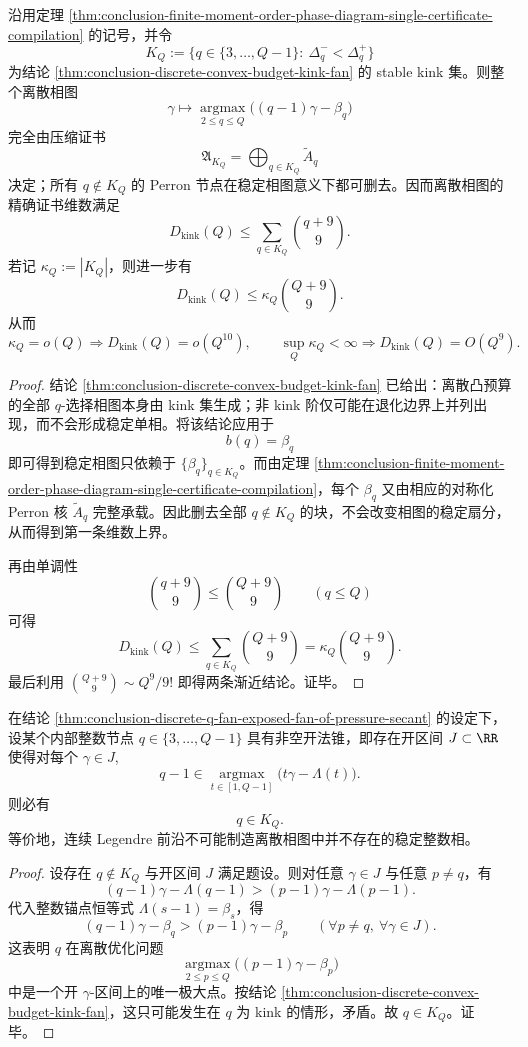 \begin{corollary}\label{cor:conclusion-kink-sparse-phase-diagram-exact-compression}
沿用定理 \ref{thm:conclusion-finite-moment-order-phase-diagram-single-certificate-compilation} 的记号，并令
\[
K_Q:=\{q\in\{3,\dots,Q-1\}:\ \Delta_q^-<\Delta_q^+\}
\]
为结论 \ref{thm:conclusion-discrete-convex-budget-kink-fan} 的 stable kink 集。则整个离散相图
\[
\gamma\longmapsto \operatorname*{argmax}_{2\le q\le Q}\bigl((q-1)\gamma-\beta_q\bigr)
\]
完全由压缩证书
\[
\mathfrak A_{K_Q}=\bigoplus_{q\in K_Q}\widetilde A_q
\]
决定；所有 \(q\notin K_Q\) 的 Perron 节点在稳定相图意义下都可删去。因而离散相图的精确证书维数满足
\[
D_{\mathrm{kink}}(Q)
\le
\sum_{q\in K_Q}\binom{q+9}{9}.
\]
若记 \(\kappa_Q:=|K_Q|\)，则进一步有
\[
D_{\mathrm{kink}}(Q)\le \kappa_Q\binom{Q+9}{9}.
\]
从而
\[
\kappa_Q=o(Q)\Longrightarrow D_{\mathrm{kink}}(Q)=o(Q^{10}),
\qquad
\sup_Q\kappa_Q<\infty \Longrightarrow D_{\mathrm{kink}}(Q)=O(Q^9).
\]
\end{corollary}
\begin{proof}
结论 \ref{thm:conclusion-discrete-convex-budget-kink-fan} 已给出：离散凸预算的全部 \(q\)-选择相图本身由 kink 集生成；非 kink 阶仅可能在退化边界上并列出现，而不会形成稳定单相。将该结论应用于
\[
b(q)=\beta_q
\]
即可得到稳定相图只依赖于 \(\{\beta_q\}_{q\in K_Q}\)。而由定理 \ref{thm:conclusion-finite-moment-order-phase-diagram-single-certificate-compilation}，每个 \(\beta_q\) 又由相应的对称化 Perron 核 \(\widetilde A_q\) 完整承载。因此删去全部 \(q\notin K_Q\) 的块，不会改变相图的稳定扇分，从而得到第一条维数上界。

再由单调性
\[
\binom{q+9}{9}\le \binom{Q+9}{9}
\qquad (q\le Q)
\]
可得
\[
D_{\mathrm{kink}}(Q)\le \sum_{q\in K_Q}\binom{Q+9}{9}
=
\kappa_Q\binom{Q+9}{9}.
\]
最后利用 \(\binom{Q+9}{9}\sim Q^9/9!\) 即得两条渐近结论。证毕。
\end{proof}

\begin{theorem}[连续压力前沿的无伪整数相]\label{thm:conclusion-continuous-pressure-front-has-no-fake-integer-phases}
在结论 \ref{thm:conclusion-discrete-q-fan-exposed-fan-of-pressure-secant} 的设定下，设某个内部整数节点 \(q\in\{3,\dots,Q-1\}\) 具有非空开法锥，即存在开区间 \(J\subset\RR\) 使得对每个 \(\gamma\in J\),
\[
q-1\in\operatorname*{argmax}_{t\in[1,Q-1]}\bigl(t\gamma-\Lambda(t)\bigr).
\]
则必有
\[
q\in K_Q.
\]
等价地，连续 Legendre 前沿不可能制造离散相图中并不存在的稳定整数相。
\end{theorem}
\begin{proof}
设存在 \(q\notin K_Q\) 与开区间 \(J\) 满足题设。则对任意 \(\gamma\in J\) 与任意 \(p\neq q\)，有
\[
(q-1)\gamma-\Lambda(q-1)>(p-1)\gamma-\Lambda(p-1).
\]
代入整数锚点恒等式 \(\Lambda(s-1)=\beta_s\)，得
\[
(q-1)\gamma-\beta_q>(p-1)\gamma-\beta_p
\qquad (\forall p\neq q,\ \forall \gamma\in J).
\]
这表明 \(q\) 在离散优化问题
\[
\operatorname*{argmax}_{2\le p\le Q}\bigl((p-1)\gamma-\beta_p\bigr)
\]
中是一个开 \(\gamma\)-区间上的唯一极大点。按结论 \ref{thm:conclusion-discrete-convex-budget-kink-fan}，这只可能发生在 \(q\) 为 kink 的情形，矛盾。故 \(q\in K_Q\)。证毕。
\end{proof}

